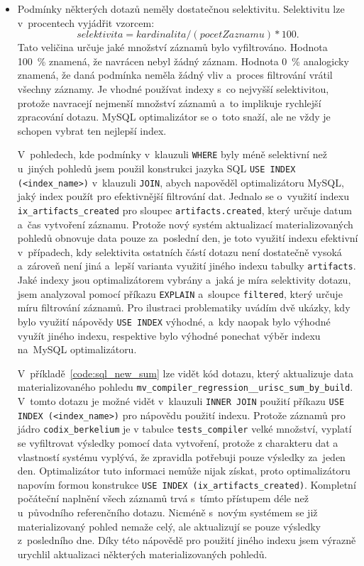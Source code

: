 \begin{itemize}[listparindent=1.55em, parsep=0em]
    \item Podmínky některých dotazů neměly dostatečnou selektivitu. Selektivitu lze v~procentech vyjádřit vzorcem:
    $$selektivita = kardinalita/(pocetZaznamu) * 100 .$$ Tato veličina určuje jaké množství záznamů bylo
    vyfiltrováno. Hodnota 100~\% znamená, že navrácen nebyl žádný záznam. Hodnota 0~\% analogicky znamená, že daná
    podmínka neměla žádný vliv a~proces filtrování vrátil všechny záznamy. Je vhodné používat indexy s~co nejvyšší
    selektivitou, protože navracejí nejmenší množství záznamů a~to implikuje rychlejší zpracování dotazu. MySQL
    optimalizátor se o~toto snaží, ale ne vždy je schopen vybrat ten nejlepší index.

    V~pohledech, kde podmínky v~klauzuli \texttt{WHERE} byly méně selektivní než u~jiných pohledů jsem použil konstrukci jazyka SQL \texttt{USE INDEX (<index\_name>)} v~klauzuli \texttt{JOIN}, abych napověděl optimalizátoru MySQL, jaký index použít pro efektivnější filtrování dat.
    Jednalo se o~využití indexu \texttt{ix\_artifacts\_created} pro sloupec \texttt{artifacts.created}, který určuje datum a~čas vytvoření záznamu. Protože nový systém aktualizací materializovaných pohledů obnovuje
    data pouze za~poslední den, je toto využití indexu efektivní v~případech, kdy selektivita ostatních částí
    dotazu není dostatečně vysoká a~zároveň není jiná a~lepší varianta využití jiného indexu tabulky \texttt{artifacts}. Jaké indexy jsou optimalizátorem vybrány a~jaká je míra selektivity dotazu, jsem
    analyzoval pomocí příkazu \texttt{EXPLAIN} a~sloupce \texttt{filtered}, který určuje míru filtrování
    záznamů. Pro ilustraci problematiky uvádím dvě ukázky, kdy bylo využití nápovědy \texttt{USE INDEX} výhodné, a~kdy naopak bylo výhodné využít jiného indexu, respektive bylo výhodné ponechat výběr indexu na~MySQL optimalizátoru.

    V~příkladě~\ref{code:sql_new_sum} lze vidět kód dotazu, který aktualizuje data materializovaného pohledu
    \texttt{mv\_compiler\_regression\_\_urisc\_sum\_by\_build}. V~tomto dotazu je možné vidět v~klauzuli \texttt{INNER~JOIN} použití příkazu \texttt{USE INDEX (<index\_name>)} pro nápovědu použití indexu. Protože záznamů pro jádro \texttt{codix\_berkelium} je v tabulce \texttt{tests\_compiler} velké množství, vyplatí se vyfiltrovat výsledky pomocí data vytvoření,
    protože z charakteru dat a vlastností systému vyplývá, že zpravidla potřebuji pouze výsledky za~jeden den. Optimalizátor tuto informaci nemůže
    nijak získat, proto optimalizátoru napovím formou konstrukce \texttt{USE~INDEX~(ix\_artifacts\_created)}. Kompletní počáteční naplnění všech záznamů trvá s~tímto přístupem déle než u~původního referenčního dotazu. Nicméně s~novým systémem se již materializovaný
    pohled nemaže celý, ale aktualizují se pouze výsledky z~posledního dne. Díky této nápovědě pro použití
    jiného indexu jsem výrazně urychlil aktualizaci některých materializovaných pohledů.
\end{itemize}

